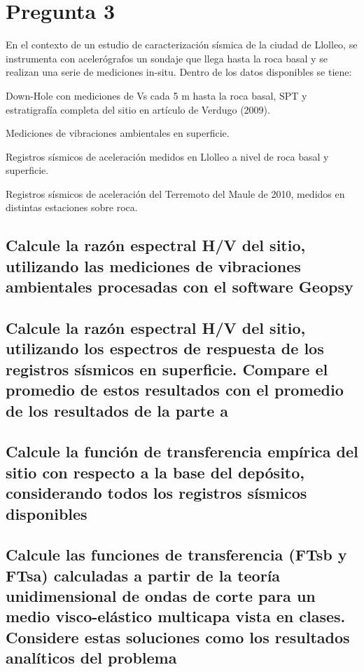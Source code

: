\newpage
\section{Pregunta 3}

En el contexto de un estudio de caracterización sísmica de la ciudad de Llolleo, se instrumenta con acelerógrafos un sondaje que llega hasta la roca basal y se realizan una serie de mediciones in-situ. Dentro de los datos disponibles se tiene:

\begin{itemizebf}
	\item Down-Hole con mediciones de Vs cada 5 m hasta la roca basal, SPT y estratigrafía completa del sitio en artículo de Verdugo (2009).
	\item Mediciones de vibraciones ambientales en superficie.
	\item Registros sísmicos de aceleración medidos en Llolleo a nivel de roca basal y superficie.
	\item Registros sísmicos de aceleración del Terremoto del Maule de 2010, medidos en distintas estaciones sobre roca.
\end{itemizebf}

\subsection{Calcule la razón espectral H/V del sitio, utilizando las mediciones de vibraciones ambientales procesadas con el software Geopsy}


\newpage
\subsection{Calcule la razón espectral H/V del sitio, utilizando los espectros de respuesta de los registros sísmicos en superficie. Compare el promedio de estos resultados con el promedio de los resultados de la parte a}


\subsection{Calcule la función de transferencia empírica del sitio con respecto a la base del depósito, considerando todos los registros sísmicos disponibles}


\subsection{Calcule las funciones de transferencia (FTsb y FTsa) calculadas a partir de la teoría unidimensional de ondas de corte para un medio visco-elástico multicapa vista en clases. Considere estas soluciones como los resultados analíticos del problema}


